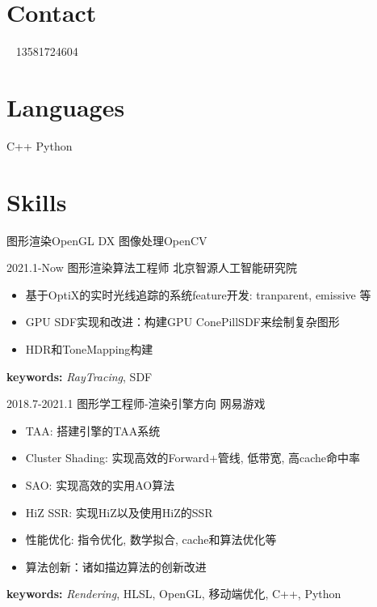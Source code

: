 \documentclass[]{cv-style} %
\begin{document}
\header{ }{  }
\begin{aside}
\section{Contact}
~
13581724604
~
\section{Languages}
C++
Python
\section{Skills}
图形渲染OpenGL DX
图像处理OpenCV
\end{aside}

\begin{entrylist}

  \entry
    {2021.1-Now}
    {图形渲染算法工程师}
    {北京智源人工智能研究院}
    {
      \vspace{-5pt}
      \leftmargini=-1cm
      \begin{itemize}
        \setlength{\itemsep}{3pt}
        \item {基于OptiX的实时光线追踪的系统feature开发: tranparent, emissive 等}
        \item {GPU SDF实现和改进：构建GPU ConePillSDF来绘制复杂图形}
        \item {HDR和ToneMapping构建}
      \end{itemize}
      \vspace{5pt}
      \hspace{-1.2cm} \textbf{keywords:} \emph{RayTracing}, SDF
    }
  


  \entry
    {2018.7-2021.1}
    {图形学工程师-渲染引擎方向}
    {网易游戏}
    {
      \vspace{-5pt}
      \leftmargini=-1cm
      \begin{itemize}
        \setlength{\itemsep}{3pt}
        \item {TAA: 搭建引擎的TAA系统}
        \item {Cluster Shading: 实现高效的Forward+管线, 低带宽, 高cache命中率}
        \item {SAO: 实现高效的实用AO算法}
        \item {HiZ SSR: 实现HiZ以及使用HiZ的SSR}
        \item {性能优化: 指令优化, 数学拟合, cache和算法优化等}
        \item {算法创新：诸如描边算法的创新改进}
      \end{itemize}
      \vspace{5pt}
      \hspace{-1.2cm} \textbf{keywords:} \emph{Rendering}, HLSL, OpenGL, 移动端优化, C++, Python
    }
  

\end{entrylist}
\end{document}
